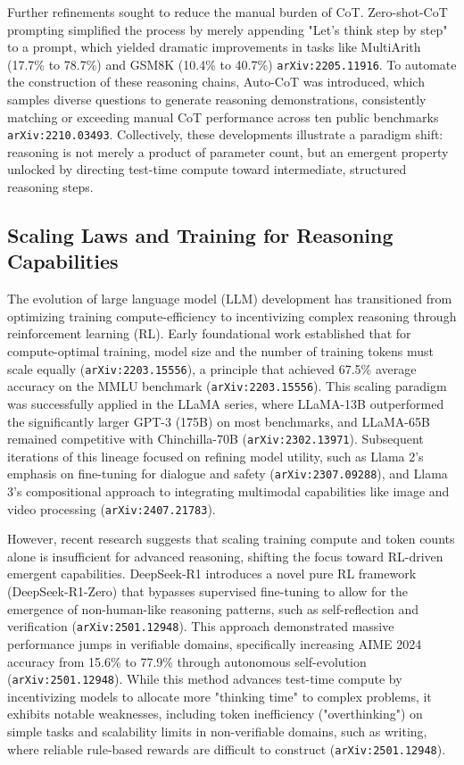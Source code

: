 \documentclass[11pt]{article}
\begin{document}
Further refinements sought to reduce the manual burden of CoT. Zero-shot-CoT prompting simplified the process by merely appending "Let's think step by step" to a prompt, which yielded dramatic improvements in tasks like MultiArith (17.7\% to 78.7\%) and GSM8K (10.4\% to 40.7\%) \texttt{arXiv:2205.11916}. To automate the construction of these reasoning chains, Auto-CoT was introduced, which samples diverse questions to generate reasoning demonstrations, consistently matching or exceeding manual CoT performance across ten public benchmarks \texttt{arXiv:2210.03493}. Collectively, these developments illustrate a paradigm shift: reasoning is not merely a product of parameter count, but an emergent property unlocked by directing test-time compute toward intermediate, structured reasoning steps.

\subsection{Scaling Laws and Training for Reasoning Capabilities}

The evolution of large language model (LLM) development has transitioned from optimizing training compute-efficiency to incentivizing complex reasoning through reinforcement learning (RL). Early foundational work established that for compute-optimal training, model size and the number of training tokens must scale equally (\texttt{arXiv:2203.15556}), a principle that achieved 67.5\% average accuracy on the MMLU benchmark (\texttt{arXiv:2203.15556}). This scaling paradigm was successfully applied in the LLaMA series, where LLaMA-13B outperformed the significantly larger GPT-3 (175B) on most benchmarks, and LLaMA-65B remained competitive with Chinchilla-70B (\texttt{arXiv:2302.13971}). Subsequent iterations of this lineage focused on refining model utility, such as Llama 2’s emphasis on fine-tuning for dialogue and safety (\texttt{arXiv:2307.09288}), and Llama 3’s compositional approach to integrating multimodal capabilities like image and video processing (\texttt{arXiv:2407.21783}).

However, recent research suggests that scaling training compute and token counts alone is insufficient for advanced reasoning, shifting the focus toward RL-driven emergent capabilities. DeepSeek-R1 introduces a novel pure RL framework (DeepSeek-R1-Zero) that bypasses supervised fine-tuning to allow for the emergence of non-human-like reasoning patterns, such as self-reflection and verification (\texttt{arXiv:2501.12948}). This approach demonstrated massive performance jumps in verifiable domains, specifically increasing AIME 2024 accuracy from 15.6\% to 77.9\% through autonomous self-evolution (\texttt{arXiv:2501.12948}). While this method advances test-time compute by incentivizing models to allocate more "thinking time" to complex problems, it exhibits notable weaknesses, including token inefficiency ("overthinking") on simple tasks and scalability limits in non-verifiable domains, such as writing, where reliable rule-based rewards are difficult to construct (\texttt{arXiv:2501.12948}).
\end{document}
